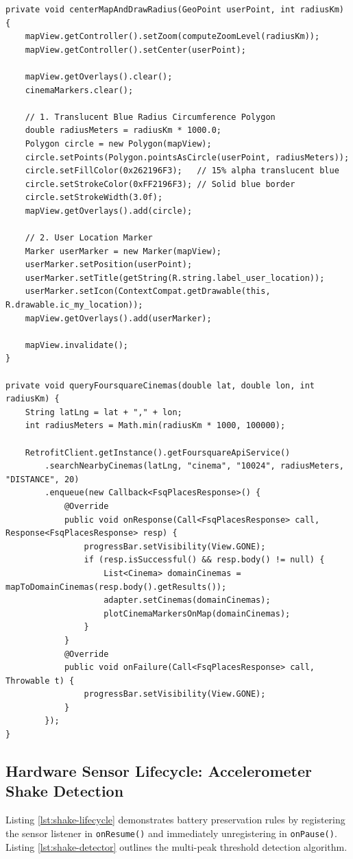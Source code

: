 \documentclass[runningheads,a4paper]{llncs}
\begin{document}
\begin{lstlisting}[style=javastyle,caption={OSMDroid Radius and Cinema Markers (CinemasActivity.java)},label={lst:cinemas-activity}]
private void centerMapAndDrawRadius(GeoPoint userPoint, int radiusKm) {
    mapView.getController().setZoom(computeZoomLevel(radiusKm));
    mapView.getController().setCenter(userPoint);

    mapView.getOverlays().clear();
    cinemaMarkers.clear();

    // 1. Translucent Blue Radius Circumference Polygon
    double radiusMeters = radiusKm * 1000.0;
    Polygon circle = new Polygon(mapView);
    circle.setPoints(Polygon.pointsAsCircle(userPoint, radiusMeters));
    circle.setFillColor(0x262196F3);   // 15% alpha translucent blue
    circle.setStrokeColor(0xFF2196F3); // Solid blue border
    circle.setStrokeWidth(3.0f);
    mapView.getOverlays().add(circle);

    // 2. User Location Marker
    Marker userMarker = new Marker(mapView);
    userMarker.setPosition(userPoint);
    userMarker.setTitle(getString(R.string.label_user_location));
    userMarker.setIcon(ContextCompat.getDrawable(this, R.drawable.ic_my_location));
    mapView.getOverlays().add(userMarker);

    mapView.invalidate();
}

private void queryFoursquareCinemas(double lat, double lon, int radiusKm) {
    String latLng = lat + "," + lon;
    int radiusMeters = Math.min(radiusKm * 1000, 100000);

    RetrofitClient.getInstance().getFoursquareApiService()
        .searchNearbyCinemas(latLng, "cinema", "10024", radiusMeters, "DISTANCE", 20)
        .enqueue(new Callback<FsqPlacesResponse>() {
            @Override
            public void onResponse(Call<FsqPlacesResponse> call, Response<FsqPlacesResponse> resp) {
                progressBar.setVisibility(View.GONE);
                if (resp.isSuccessful() && resp.body() != null) {
                    List<Cinema> domainCinemas = mapToDomainCinemas(resp.body().getResults());
                    adapter.setCinemas(domainCinemas);
                    plotCinemaMarkersOnMap(domainCinemas);
                }
            }
            @Override
            public void onFailure(Call<FsqPlacesResponse> call, Throwable t) {
                progressBar.setVisibility(View.GONE);
            }
        });
}
\end{lstlisting}

\subsection{Hardware Sensor Lifecycle: Accelerometer Shake Detection}
Listing \ref{lst:shake-lifecycle} demonstrates battery preservation rules by registering the sensor listener in \texttt{onResume()} and immediately unregistering in \texttt{onPause()}. Listing \ref{lst:shake-detector} outlines the multi-peak threshold detection algorithm.
\end{document}
